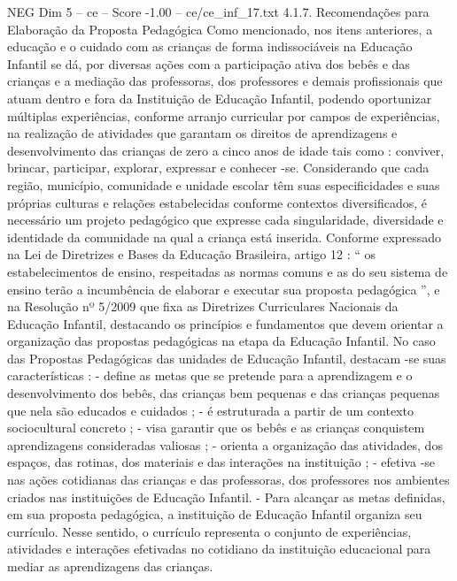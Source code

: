 \begin{textsample}{NEG Dim 5 – ce – Score -1.00 – ce/ce\_inf\_17.txt}  \label{ex:f5_neg_040}
4.1.7.
Recomendações para Elaboração da Proposta Pedagógica Como mencionado, nos itens anteriores, a educação e o cuidado com as crianças de forma indissociáveis na Educação Infantil se dá, por diversas ações com a participação ativa dos bebês e das crianças e a mediação das professoras, dos professores e demais profissionais que atuam dentro e fora da Instituição de Educação Infantil, podendo oportunizar múltiplas experiências, conforme arranjo curricular por campos de experiências, na realização de atividades que garantam os direitos de aprendizagens e desenvolvimento das crianças de zero a cinco anos de idade tais como : conviver, brincar, participar, explorar, expressar e conhecer -se.
Considerando que cada região, município, comunidade e unidade escolar têm suas especificidades e suas próprias culturas e relações estabelecidas conforme contextos diversificados, é necessário um projeto pedagógico que expresse cada singularidade, diversidade e identidade da comunidade na qual a criança está inserida.
Conforme expressado na Lei de Diretrizes e Bases da Educação Brasileira, artigo 12 : “ os estabelecimentos de ensino, respeitadas as normas comuns e as do seu sistema de ensino terão a incumbência de elaborar e executar sua proposta pedagógica ”, e na Resolução nº 5/2009 que fixa as Diretrizes Curriculares Nacionais da Educação Infantil, destacando os princípios e fundamentos que devem orientar a organização das propostas pedagógicas na etapa da Educação Infantil.
No caso das Propostas Pedagógicas das unidades de Educação Infantil, destacam -se suas características : - define as metas que se pretende para a aprendizagem e o desenvolvimento dos bebês, das crianças bem pequenas e das crianças pequenas que nela são educados e cuidados ; - é estruturada a partir de um contexto sociocultural concreto ; - visa garantir que os bebês e as crianças conquistem aprendizagens consideradas valiosas ; - orienta a organização das atividades, dos espaços, das rotinas, dos materiais e das interações na instituição ; - efetiva -se nas ações cotidianas das crianças e das professoras, dos professores nos ambientes criados nas instituições de Educação Infantil. - Para alcançar as metas definidas, em sua proposta pedagógica, a instituição de Educação Infantil organiza seu currículo.
Nesse sentido, o currículo representa o conjunto de experiências, atividades e interações efetivadas no cotidiano da instituição educacional para mediar as aprendizagens das crianças.

\end{textsample}
